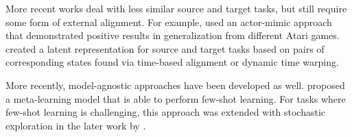 More recent works deal with less similar source and target tasks, but still require some form of external alignment.
For example, \citet{parisotto2015actor} used an actor-mimic approach that demonstrated positive results in generalization from different Atari games.
\citet{gupta2017learning} created a latent representation for source and target tasks based on pairs of corresponding states found via time-based alignment or dynamic time warping.

More recently, model-agnostic approaches have been developed as well.
\citet{MAML} proposed a meta-learning model that is able to perform few-shot learning.
For tasks where 
few-shot learning is challenging, this approach was extended with stochastic exploration in the later work by \citet{MAESN}.



